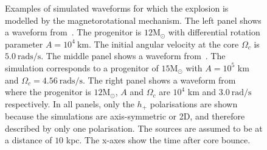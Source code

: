 \documentclass[aps,twocolumn,showpacs,groupedaddress, nofootinbib]{revtex4}  %
\begin{document}

%
%
\begin{figure}
     \begin{center}
        \quad
        \quad
    \end{center}
    \caption{Examples of simulated waveforms for which the explosion is modelled by
the magnetorotational mechanism. The left panel shows a waveform
from~\cite{abdikamalov2014measuring}. The progenitor is $12\text{M}_\odot$ with
differential rotation parameter $A=10^4~\text{km}$. The initial angular velocity
at the core $\Omega_c$ is $5.0~\text{rads/s}$. The middle panel shows a waveform
from~\cite{dimmelmeier2008gravitational}. The simulation corresponds to a
progenitor of $15\text{M}_\odot$ with $A=10^5$ km and $\Omega_c =
4.56~\text{rads/s}$.  The right panel shows a waveform
from~\cite{richers2017equation} where the progenitor is $12\text{M}_\odot$, $A$
and $\Omega_c$ are $10^4$ km and $3.0~\text{rad/s}$ respectively. In all panels,
only the $h_{+}$ polarisations are shown because the simulations are
axis-symmetric or 2D, and therefore described by only one polarisation.  The
sources are assumed to be at a distance of $10$ kpc. The x-axes show the time after 
core bounce.\label{fig:magwaveforms}} 
\end{figure}
\end{document}
